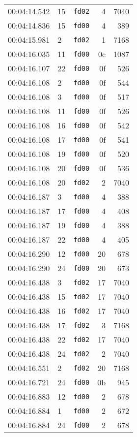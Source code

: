 \documentclass{article}
\begin{document}
\begin{longtable}{lllrr}
00:04:14.542 & 15 & \texttt{fd02} & 4 & 7040 \\
00:04:14.836 & 15 & \texttt{fd00} & 4 & 389 \\
00:04:15.981 & 2 & \texttt{fd02} & 1 & 7168 \\
00:04:16.035 & 11 & \texttt{fd00} & 0c & 1087 \\
00:04:16.107 & 22 & \texttt{fd00} & 0f & 526 \\
00:04:16.108 & 2 & \texttt{fd00} & 0f & 544 \\
00:04:16.108 & 3 & \texttt{fd00} & 0f & 517 \\
00:04:16.108 & 11 & \texttt{fd00} & 0f & 526 \\
00:04:16.108 & 16 & \texttt{fd00} & 0f & 542 \\
00:04:16.108 & 17 & \texttt{fd00} & 0f & 541 \\
00:04:16.108 & 19 & \texttt{fd00} & 0f & 520 \\
00:04:16.108 & 20 & \texttt{fd00} & 0f & 536 \\
00:04:16.108 & 20 & \texttt{fd02} & 2 & 7040 \\
00:04:16.187 & 3 & \texttt{fd00} & 4 & 388 \\
00:04:16.187 & 17 & \texttt{fd00} & 4 & 408 \\
00:04:16.187 & 19 & \texttt{fd00} & 4 & 388 \\
00:04:16.187 & 22 & \texttt{fd00} & 4 & 405 \\
00:04:16.290 & 12 & \texttt{fd00} & 20 & 678 \\
00:04:16.290 & 24 & \texttt{fd00} & 20 & 673 \\
00:04:16.438 & 3 & \texttt{fd02} & 17 & 7040 \\
00:04:16.438 & 15 & \texttt{fd02} & 17 & 7040 \\
00:04:16.438 & 16 & \texttt{fd02} & 17 & 7040 \\
00:04:16.438 & 17 & \texttt{fd02} & 3 & 7168 \\
00:04:16.438 & 22 & \texttt{fd02} & 17 & 7040 \\
00:04:16.438 & 24 & \texttt{fd02} & 2 & 7040 \\
00:04:16.551 & 2 & \texttt{fd02} & 20 & 7168 \\
00:04:16.721 & 24 & \texttt{fd00} & 0b & 945 \\
00:04:16.883 & 12 & \texttt{fd00} & 2 & 678 \\
00:04:16.884 & 1 & \texttt{fd00} & 2 & 672 \\
00:04:16.884 & 24 & \texttt{fd00} & 2 & 678 \\

\end{longtable}
\end{document}
